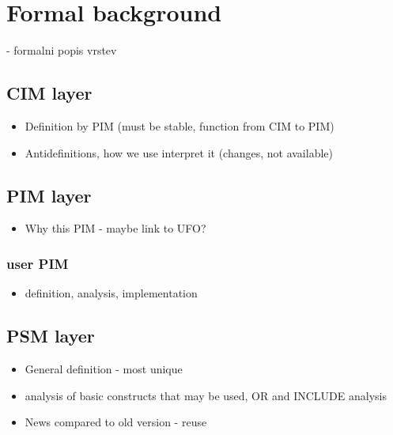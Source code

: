 \chapter{Formal background} - formalni popis vrstev
\label{chapters:formal-background}

\section{CIM layer}

\begin{itemize}
    \item Definition by PIM (must be stable, function from CIM to PIM)
    \item Antidefinitions, how we use interpret it (changes, not available)
\end{itemize}

\section{PIM layer}

\begin{itemize}
    \item Why this PIM - maybe link to UFO?
\end{itemize}

\subsection{user PIM}

\begin{itemize}
    \item definition, analysis, implementation
\end{itemize}

\section{PSM layer}

\begin{itemize}
    \item General definition - most unique
    \item analysis of basic constructs that may be used, OR and INCLUDE analysis
    \item News compared to old version - reuse
\end{itemize}